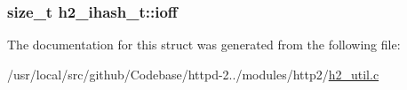 \subsubsection[{\texorpdfstring{ioff}{ioff}}]{\setlength{\rightskip}{0pt plus 5cm}size\+\_\+t h2\+\_\+ihash\+\_\+t\+::ioff}\hypertarget{structh2__ihash__t_a3acca54a6626295436daa085679863a7}{}\label{structh2__ihash__t_a3acca54a6626295436daa085679863a7}


The documentation for this struct was generated from the following file\+:\begin{DoxyCompactItemize}
\item 
/usr/local/src/github/\+Codebase/httpd-\/2../modules/http2/\hyperlink{h2__util_8c}{h2\+\_\+util.\+c}\end{DoxyCompactItemize}
